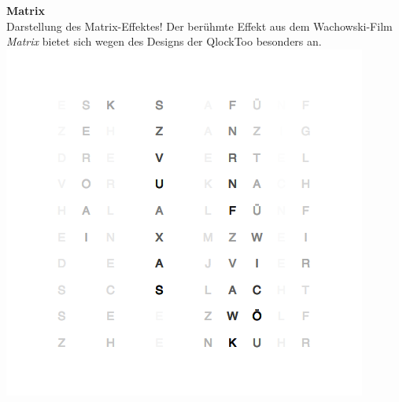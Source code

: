 \begin{multicols}{2}
\textbf{Matrix} \\
Darstellung des Matrix-Effektes! Der berühmte Effekt aus dem Wachowski-Film \emph{Matrix} bietet sich wegen des Designs der QlockToo besonders an.
\includegraphics[width=\columnwidth]{Abbildungen/Software/Demo/Matrix}


\end{multicols}

